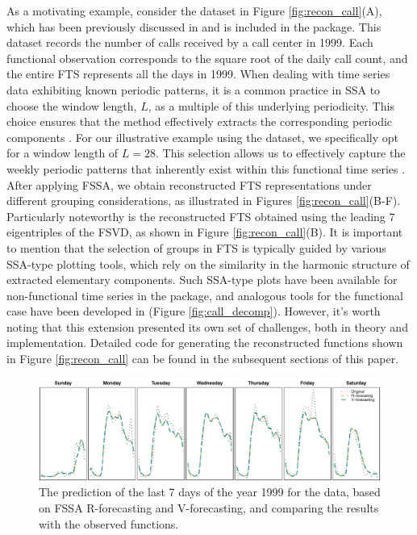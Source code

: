 As a motivating example, consider the  dataset in Figure 
\ref{fig:recon_call}(A), which has been previously discussed in 
\cite{maadooliat2015integrating} and is included in the package. This dataset 
records the number of calls received by a call center in 1999. Each functional 
observation corresponds to the square root of the daily call count, and the entire 
FTS represents all the days in 1999. 
When dealing with time series data exhibiting known periodic patterns, it is a common practice in SSA to choose the window length, $L$, as a multiple of this underlying periodicity. This choice ensures that the method effectively extracts the corresponding periodic components \citep{golyandina2001}.
For our illustrative example using the  dataset, we specifically opt for a window length of $L=28$. This selection allows us to effectively capture the weekly periodic patterns that inherently exist within this functional time series \citep{haghbin2021}. After applying FSSA, we 
obtain reconstructed FTS representations under 
different grouping considerations, as illustrated in Figures 
\ref{fig:recon_call}(B-F). Particularly noteworthy is the reconstructed FTS obtained 
using the leading 7 eigentriples of the FSVD, as shown in Figure 
\ref{fig:recon_call}(B).
It is important to mention that the selection of groups in FTS is typically guided 
by 
various SSA-type plotting tools, which rely on the similarity in the harmonic 
structure of extracted elementary components. Such SSA-type plots have been 
available for non-functional time series in the  package, and analogous 
tools for the functional case have been developed in  (Figure 
\ref{fig:call_decomp}). However, it's worth noting that this 
extension presented its own set of challenges, both in theory and implementation. 
Detailed code for generating the reconstructed functions shown in Figure 
\ref{fig:recon_call} can be found in the subsequent sections of this paper.
\begin{figure}[t!]
	\centering
	\includegraphics[width=\textwidth]{figures/call_fc.pdf}
	\caption{The prediction of the last 7 days of the year 1999 for the 
		data, based on FSSA R-forecasting and V-forecasting, and comparing the 
		results 
		with the observed functions.}
	\label{fig:for_call}
\end{figure}
